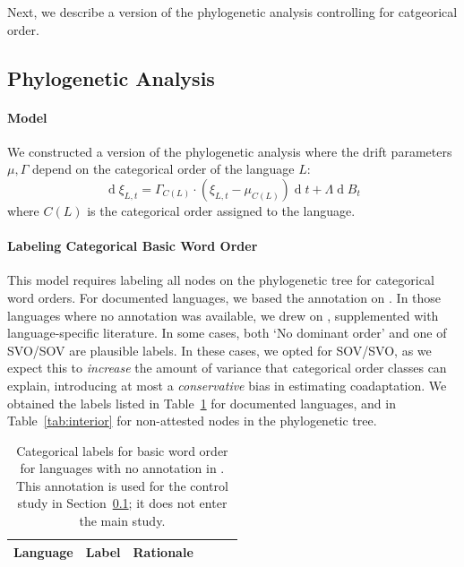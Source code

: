 \documentclass[11pt,a4paper]{article}
\begin{document}
Next, we describe a version of the phylogenetic analysis controlling for catgeorical order.

\subsection{Phylogenetic Analysis}\label{sec:categorical}


\paragraph{Model}

We constructed a version of the phylogenetic analysis where the drift parameters $\mu, \Gamma$ depend on the categorical order of the language $L$:
\begin{equation*}
    \operatorname{d}\xi_{L,t} = \Gamma_{C(L)} \cdot (\xi_{L,t}-\mu_{C(L)}) \operatorname{d}t + \Lambda \operatorname{d}B_t
\end{equation*}
where $C(L)$ is the categorical order assigned to the language.

\paragraph{Labeling Categorical Basic Word Order}
This model requires labeling all nodes on the phylogenetic tree for categorical word orders.
For documented languages, we based the annotation on \citet{wals-81}.
In those languages where no annotation was available, we drew on \citep{gell-mann-origin-2011}, supplemented with language-specific literature.
In some cases, both `No dominant order' and one of SVO/SOV are plausible labels. In these cases, we opted for SOV/SVO, as we expect this to \emph{increase} the amount of variance that categorical order classes can explain, introducing at most a \emph{conservative} bias in estimating coadaptation.
We obtained the labels listed in Table~\ref{tab:categorical} for documented languages, and in Table~\ref{tab:interior} for non-attested nodes in the phylogenetic tree.

\begin{table}
\begin{tabular}{llp{}lll}
\hline
	Language & Label & Rationale \\ \hline

\hline
\end{tabular}
	\caption{Categorical labels for basic word order for languages with no annotation in \citet{wals-81}. This annotation is used for the control study in Section~\ref{sec:categorical}; it does not enter the main study.}\label{tab:categorical}

\end{table}
\end{document}
